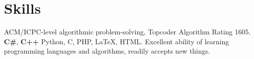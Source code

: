 \documentclass[10pt,a4paper,roman]{moderncv} %
\begin{document}
\section{Skills}
       {ACM/ICPC-level algorithmic problem-solving, Topcoder Algorithm Rating 1605\footnotemark[5]{}.}
       {\textbf{C\#}, \textbf{C++}\newline{}%
        Python, C, PHP, \LaTeX, HTML.}
       {Excellent ability of learning programming languages and algorithms, readily accepts new things.}
\end{document}
